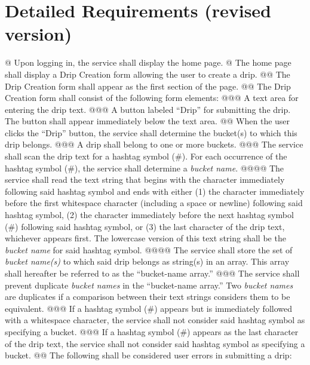 \documentclass{article}
\begin{document}
\section*{Detailed Requirements (revised version)}


\newcommand{\dripMaxLength}{160}

\begin{easylist}[articletoc]
@ Upon logging in, the service shall display the home page.
@ The home page shall display a Drip Creation form allowing the user to create a drip.
@@ The Drip Creation form shall appear as the first section of the page.
@@ The Drip Creation form shall consist of the following form elements:
@@@ A text area for entering the drip text.
@@@ A button labeled ``Drip'' for submitting the drip. The button shall appear immediately below the text area.
@@ \label{submit-drip}When the user clicks the ``Drip'' button, the service shall determine the bucket(s) to which this drip belongs.
@@@ A drip shall belong to one or more buckets.
@@@ The service shall scan the drip text for a hashtag symbol (\#). For each occurrence of the hashtag symbol (\#), the service shall determine a \textit{bucket name}.
@@@@ The service shall read the text string that begins with the character immediately following said hashtag symbol and ends with either (1) the character immediately before the first whitespace character (including a space or newline) following said hashtag symbol, (2) the character immediately before the next hashtag symbol (\#) following said hashtag symbol, or (3) the last character of the drip text, whichever appears first. The lowercase version of this text string shall be the \textit{bucket name} for said hashtag symbol.
@@@@ \label{bucket-name-array}The service shall store the set of \textit{bucket name(s)} to which said drip belongs as string(s) in an array. This array shall hereafter be referred to as the ``bucket-name array.''
@@@ The service shall prevent duplicate \textit{bucket names} in the ``bucket-name array.'' Two \textit{bucket names} are duplicates if a comparison between their text strings considers them to be equivalent.
@@@ If a hashtag symbol (\#) appears but is immediately followed with a whitespace character, the service shall not consider said hashtag symbol as specifying a bucket.
@@@ If a hashtag symbol (\#) appears as the last character of the drip text, the service shall not consider said hashtag symbol as specifying a bucket.
@@ \label{bucket-error}The following shall be considered user errors in submitting a drip:

\end{easylist}
\end{document}

